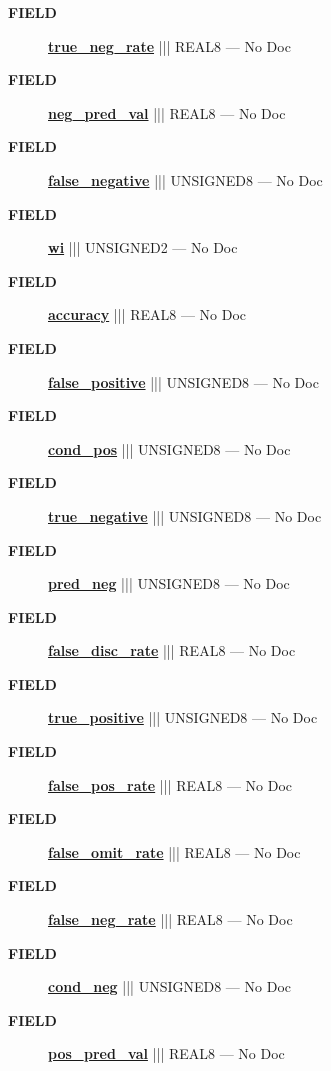 \par
\begin{description}
\item [\colorbox{tagtype}{\color{white} \textbf{\textsf{FIELD}}}] \textbf{\underline{true\_neg\_rate}} ||| REAL8 --- No Doc
\item [\colorbox{tagtype}{\color{white} \textbf{\textsf{FIELD}}}] \textbf{\underline{neg\_pred\_val}} ||| REAL8 --- No Doc
\item [\colorbox{tagtype}{\color{white} \textbf{\textsf{FIELD}}}] \textbf{\underline{false\_negative}} ||| UNSIGNED8 --- No Doc
\item [\colorbox{tagtype}{\color{white} \textbf{\textsf{FIELD}}}] \textbf{\underline{wi}} ||| UNSIGNED2 --- No Doc
\item [\colorbox{tagtype}{\color{white} \textbf{\textsf{FIELD}}}] \textbf{\underline{accuracy}} ||| REAL8 --- No Doc
\item [\colorbox{tagtype}{\color{white} \textbf{\textsf{FIELD}}}] \textbf{\underline{false\_positive}} ||| UNSIGNED8 --- No Doc
\item [\colorbox{tagtype}{\color{white} \textbf{\textsf{FIELD}}}] \textbf{\underline{cond\_pos}} ||| UNSIGNED8 --- No Doc
\item [\colorbox{tagtype}{\color{white} \textbf{\textsf{FIELD}}}] \textbf{\underline{true\_negative}} ||| UNSIGNED8 --- No Doc
\item [\colorbox{tagtype}{\color{white} \textbf{\textsf{FIELD}}}] \textbf{\underline{pred\_neg}} ||| UNSIGNED8 --- No Doc
\item [\colorbox{tagtype}{\color{white} \textbf{\textsf{FIELD}}}] \textbf{\underline{false\_disc\_rate}} ||| REAL8 --- No Doc
\item [\colorbox{tagtype}{\color{white} \textbf{\textsf{FIELD}}}] \textbf{\underline{true\_positive}} ||| UNSIGNED8 --- No Doc
\item [\colorbox{tagtype}{\color{white} \textbf{\textsf{FIELD}}}] \textbf{\underline{false\_pos\_rate}} ||| REAL8 --- No Doc
\item [\colorbox{tagtype}{\color{white} \textbf{\textsf{FIELD}}}] \textbf{\underline{false\_omit\_rate}} ||| REAL8 --- No Doc
\item [\colorbox{tagtype}{\color{white} \textbf{\textsf{FIELD}}}] \textbf{\underline{false\_neg\_rate}} ||| REAL8 --- No Doc
\item [\colorbox{tagtype}{\color{white} \textbf{\textsf{FIELD}}}] \textbf{\underline{cond\_neg}} ||| UNSIGNED8 --- No Doc
\item [\colorbox{tagtype}{\color{white} \textbf{\textsf{FIELD}}}] \textbf{\underline{pos\_pred\_val}} ||| REAL8 --- No Doc

\end{description}
